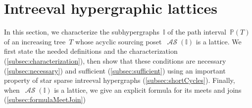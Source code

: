 \documentclass{amsart}
\theoremstyle{definition}
\newcommand{\Vincent}[1]{\todo[size=\tiny,color=blue!30]{ #1 \\ \hfill --- V.}\,}
\DeclareMathOperator{\ASour}{\mathcal{AS}}  %
\newcommand{\II}{\mathbb I} %
\newcommand{\PP}{\mathbb P} %
\begin{document}


%


\section{Intreeval hypergraphic lattices}
\label{sec:intreevalHypergraphicPosets}

In this section, we characterize the subhypergraphs~$\II$ of the path interval~$\PP(T)$ of an increasing tree~$T$ whose acyclic sourcing poset~$\ASour(\II)$ is a lattice.
We first state the needed definitions and the characterization (\cref{subsec:characterization}), then show that these conditions are necessary (\cref{subsec:necessary}) and sufficient (\cref{subsec:sufficient}) using an important property of star sparse intreeval hypergraphs (\cref{subsec:shortCycles}).
Finally, when~$\ASour(\II)$ is a lattice, we give an explicit formula for its meets and joins (\cref{subsec:formulaMeetJoin})
\end{document}
